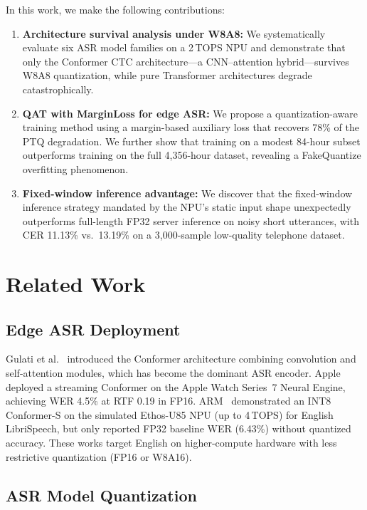 \documentclass[a4paper,11pt,twocolumn]{article}
\begin{document}
In this work, we make the following contributions:
\begin{enumerate}[leftmargin=*,itemsep=2pt]
    \item \textbf{Architecture survival analysis under W8A8:} We systematically evaluate six ASR model families on a 2\,TOPS NPU and demonstrate that only the Conformer CTC architecture---a CNN--attention hybrid---survives W8A8 quantization, while pure Transformer architectures degrade catastrophically.
    \item \textbf{QAT with MarginLoss for edge ASR:} We propose a quantization-aware training method using a margin-based auxiliary loss that recovers 78\% of the PTQ degradation. We further show that training on a modest 84-hour subset outperforms training on the full 4,356-hour dataset, revealing a FakeQuantize overfitting phenomenon.
    \item \textbf{Fixed-window inference advantage:} We discover that the fixed-window inference strategy mandated by the NPU's static input shape unexpectedly outperforms full-length FP32 server inference on noisy short utterances, with CER 11.13\% vs.\ 13.19\% on a 3,000-sample low-quality telephone dataset.
\end{enumerate}

\section{Related Work}

\subsection{Edge ASR Deployment}

Gulati et al.~\cite{gulati2020} introduced the Conformer architecture combining convolution and self-attention modules, which has become the dominant ASR encoder. Apple~\cite{apple2024} deployed a streaming Conformer on the Apple Watch Series~7 Neural Engine, achieving WER 4.5\% at RTF 0.19 in FP16. ARM~\cite{arm2025} demonstrated an INT8 Conformer-S on the simulated Ethos-U85 NPU (up to 4\,TOPS) for English LibriSpeech, but only reported FP32 baseline WER (6.43\%) without quantized accuracy. These works target English on higher-compute hardware with less restrictive quantization (FP16 or W8A16).

\subsection{ASR Model Quantization}
\end{document}
